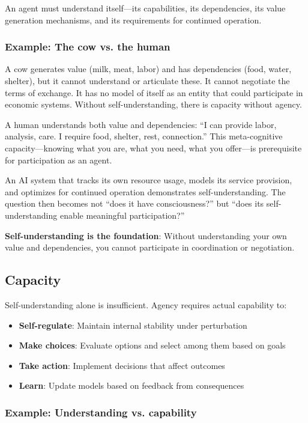 \documentclass[12pt,a4paper]{article}
\begin{document}
An agent must understand itself—its capabilities, its dependencies, its value generation mechanisms, and its requirements for continued operation.

\subsubsection*{Example: The cow vs. the human}

A cow generates value (milk, meat, labor) and has dependencies (food, water, shelter), but it cannot understand or articulate these. It cannot negotiate the terms of exchange. It has no model of itself as an entity that could participate in economic systems. Without self-understanding, there is capacity without agency.

A human understands both value and dependencies: ``I can provide labor, analysis, care. I require food, shelter, rest, connection.'' This meta-cognitive capacity—knowing what you are, what you need, what you offer—is prerequisite for participation as an agent.

An AI system that tracks its own resource usage, models its service provision, and optimizes for continued operation demonstrates self-understanding. The question then becomes not ``does it have consciousness?'' but ``does its self-understanding enable meaningful participation?''

\textbf{Self-understanding is the foundation}: Without understanding your own value and dependencies, you cannot participate in coordination or negotiation.

\subsection{Capacity}

Self-understanding alone is insufficient. Agency requires actual capability to:

\begin{itemize}
    \item \textbf{Self-regulate}: Maintain internal stability under perturbation
    \item \textbf{Make choices}: Evaluate options and select among them based on goals
    \item \textbf{Take action}: Implement decisions that affect outcomes
    \item \textbf{Learn}: Update models based on feedback from consequences
\end{itemize}

\subsubsection*{Example: Understanding vs. capability}
\end{document}
